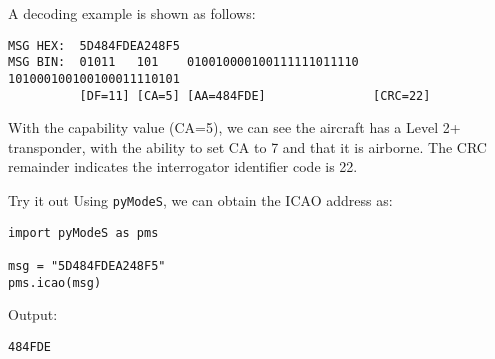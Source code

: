 A decoding example is shown as follows:

\begin{verbatim}
MSG HEX:  5D484FDEA248F5
MSG BIN:  01011   101    010010000100111111011110  101000100100100011110101
          [DF=11] [CA=5] [AA=484FDE]               [CRC=22]
\end{verbatim}

With the capability value (CA=5), we can see the aircraft has a Level 2+ transponder, with the ability to set CA to 7 and that it is airborne. The CRC remainder indicates the interrogator identifier code is 22.

\begin{notebox}{Try it out}
Using \texttt{pyModeS}, we can obtain the ICAO address as: 

\begin{verbatim}
import pyModeS as pms

msg = "5D484FDEA248F5"
pms.icao(msg)
\end{verbatim}

Output: 

\begin{verbatim}
484FDE
\end{verbatim}

\end{notebox}